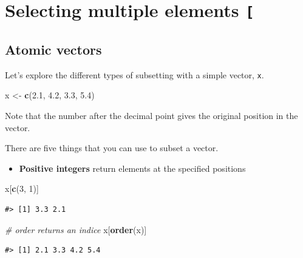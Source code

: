 \documentclass[]{book}
\newenvironment{Shaded}{\begin{snugshade}}{\end{snugshade}}
\newcommand{\KeywordTok}[1]{\textcolor[rgb]{0.13,0.29,0.53}{\textbf{#1}}}
\newcommand{\DecValTok}[1]{\textcolor[rgb]{0.00,0.00,0.81}{#1}}
\newcommand{\FloatTok}[1]{\textcolor[rgb]{0.00,0.00,0.81}{#1}}
\newcommand{\StringTok}[1]{\textcolor[rgb]{0.31,0.60,0.02}{#1}}
\newcommand{\CommentTok}[1]{\textcolor[rgb]{0.56,0.35,0.01}{\textit{#1}}}
\newcommand{\NormalTok}[1]{#1}
\providecommand{\tightlist}{%
  \setlength{\itemsep}{0pt}\setlength{\parskip}{0pt}}
\theoremstyle{definition}
\theoremstyle{definition}
\theoremstyle{definition}
\theoremstyle{remark}
\begin{document}
\section{\texorpdfstring{Selecting multiple elements
\texttt{{[}}}{Selecting multiple elements {[}}}\label{selecting-multiple-elements}

\subsection{Atomic vectors}\label{atomic-vectors-1}

Let's explore the different types of subsetting with a simple vector,
\texttt{x}.

\begin{Shaded}
\begin{Highlighting}[]
\NormalTok{x <-}\StringTok{ }\KeywordTok{c}\NormalTok{(}\FloatTok{2.1}\NormalTok{, }\FloatTok{4.2}\NormalTok{, }\FloatTok{3.3}\NormalTok{, }\FloatTok{5.4}\NormalTok{)}
\end{Highlighting}
\end{Shaded}

Note that the number after the decimal point gives the original position
in the vector.

There are five things that you can use to subset a vector.

\begin{itemize}
\tightlist
\item
  \textbf{Positive integers} return elements at the specified positions
\end{itemize}

\begin{Shaded}
\begin{Highlighting}[]
\NormalTok{x[}\KeywordTok{c}\NormalTok{(}\DecValTok{3}\NormalTok{, }\DecValTok{1}\NormalTok{)]}
\end{Highlighting}
\end{Shaded}

\begin{verbatim}
#> [1] 3.3 2.1
\end{verbatim}

\begin{Shaded}
\begin{Highlighting}[]
\CommentTok{# order returns an indice}
\NormalTok{x[}\KeywordTok{order}\NormalTok{(x)]}
\end{Highlighting}
\end{Shaded}

\begin{verbatim}
#> [1] 2.1 3.3 4.2 5.4
\end{verbatim}
\end{document}
